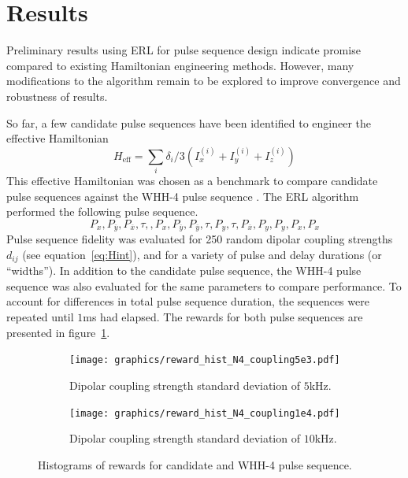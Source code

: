 \documentclass{article}
\begin{document}
\section{Results}

Preliminary results using ERL for pulse sequence design indicate promise compared to existing Hamiltonian engineering methods. However, many modifications to the algorithm remain to be explored to improve convergence and robustness of results.

So far, a few candidate pulse sequences have been identified to engineer the effective Hamiltonian
\begin{equation}
    H_\text{eff} = \sum_i \delta_i/3 (I_x^{(i)} + I_y^{(i)} + I_z^{(i)})
\end{equation}
This effective Hamiltonian was chosen as a benchmark to compare candidate pulse sequences against the WHH-4 pulse sequence \cite{PhysRevLett.20.180}. The ERL algorithm performed the following pulse sequence.
\begin{equation}\label{eq:candidate4}
    P_x, P_{\overline{y}}, P_{\overline{x}}, \tau, , P_x, P_{\overline{y}},
    P_{\overline{y}}, \tau, P_y, \tau, P_{\overline{x}}, P_y, P_y, P_x, P_x
\end{equation}
Pulse sequence fidelity was evaluated for 250 random dipolar coupling strengths $d_{ij}$ (see equation~\ref{eq:Hint}), and for a variety of pulse and delay durations (or ``widths''). In addition to the candidate pulse sequence, the WHH-4 pulse sequence was also evaluated for the same parameters to compare performance. To account for differences in total pulse sequence duration, the sequences were repeated until $1$ms had elapsed. The rewards for both pulse sequences are presented in figure~\ref{fig:candidate_hist}.

\begin{figure}[H]
    \centering
    \begin{subfigure}{\linewidth}
        \centering
        \texttt{[image: graphics/reward\_hist\_N4\_coupling5e3.pdf]}
        \caption{Dipolar coupling strength standard deviation of $5$kHz.}
    \end{subfigure}
    \begin{subfigure}{\linewidth}
        \centering
        \texttt{[image: graphics/reward\_hist\_N4\_coupling1e4.pdf]}
        \caption{Dipolar coupling strength standard deviation of $10$kHz.}
    \end{subfigure}
    \caption{Histograms of rewards for candidate and WHH-4 pulse sequence.}
    \label{fig:candidate_hist}
\end{figure}
\end{document}
